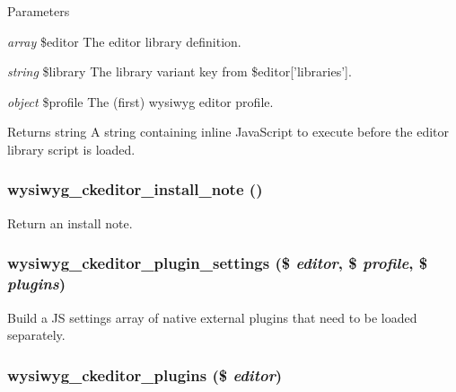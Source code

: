 \begin{DoxyParams}{Parameters}
\item[{\em array}]\$editor The editor library definition. \item[{\em string}]\$library The library variant key from \$editor\mbox{[}'libraries'\mbox{]}. \item[{\em object}]\$profile The (first) wysiwyg editor profile.\end{DoxyParams}
\begin{DoxyReturn}{Returns}
string A string containing inline JavaScript to execute before the editor library script is loaded. 
\end{DoxyReturn}
\hypertarget{ckeditor_8inc_a72a39d7442d839515d6280eb5f5adbe3}{
\subsubsection[{wysiwyg\_\-ckeditor\_\-install\_\-note}]{\setlength{\rightskip}{0pt plus 5cm}wysiwyg\_\-ckeditor\_\-install\_\-note ()}}
\label{ckeditor_8inc_a72a39d7442d839515d6280eb5f5adbe3}
Return an install note. \hypertarget{ckeditor_8inc_a5b4c9ea46e84b684291c1eebfa0496c9}{
\subsubsection[{wysiwyg\_\-ckeditor\_\-plugin\_\-settings}]{\setlength{\rightskip}{0pt plus 5cm}wysiwyg\_\-ckeditor\_\-plugin\_\-settings (\$ {\em editor}, \/  \$ {\em profile}, \/  \$ {\em plugins})}}
\label{ckeditor_8inc_a5b4c9ea46e84b684291c1eebfa0496c9}
Build a JS settings array of native external plugins that need to be loaded separately. \hypertarget{ckeditor_8inc_ab92e1bed993d878f7258749b02d074a1}{
\subsubsection[{wysiwyg\_\-ckeditor\_\-plugins}]{\setlength{\rightskip}{0pt plus 5cm}wysiwyg\_\-ckeditor\_\-plugins (\$ {\em editor})}}
